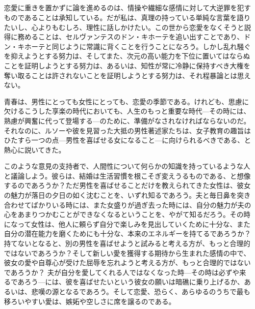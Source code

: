 \subsection{}

  恋愛に重きを置かずに論を進めるのは、情操や繊細な感情に対して大逆罪を犯すものであることは承知している。だが私は、真理の持っている単純な言葉を語りたいし、心よりもむしろ、理性に話しかけたい。この世から恋愛をなくそうと説得に務めることは、セルヴァンテスのドン・キホーテを追い出すことであり、ドン・キホーテと同じように常識に背くことを行うことになろう。しかし乱れ騒ぐを抑えようとする努力は、そしてまた、次元の高い能力を下位に置いてはならぬことを証明しようとする努力は、あるいは、知性が常に冷静に保持すべき大権を奪い取ることは許されないことを証明しようとする努力は、それ程暴論とは思えない。

  青春は、男性にとっても女性にとっても、恋愛の季節である。けれども、思慮に欠けるこうした享楽の時代においても、人生のもっと重要な時代{\——}その時には、熟慮が興奮に代って登場する{\——}のために、準備がなされなければならないのだ。それなのに、ルソーや彼を見習った大抵の男性著述家たちは、女子教育の趣旨はひたすら一つの点{\——}男性を喜ばせる女になること{\——}に向けられるべきである、と熱心に説いてきた。

  このような意見の支持者で、人間性について何らかの知識を持っているような人と議論しよう。彼らは、結婚は生活習慣を根こそぎ変えうるものである、と想像するのであろうか？ただ男性を喜ばせることだけを教えられてきた女性は、彼女の魅力が落日の夕日の如く沈むことを、いずれ知るであろう。夫と毎日鼻を突き合わせてばかりいる時には、また女盛りが過ぎ去った時には、自分の魅力が夫の心をあまりつかむことができなくなるということを、やがて知るだろう。その時になって女性は、他人に頼らず自分で楽しみを見出していくために十分な、また自分の潜在能力を磨くためにも十分な、本来のエネルギーを持てるであろうか？持てないとなると、別の男性を喜ばせようと試みると考える方が、もっと合理的ではないであろうか？そして新しい愛を獲得する期待から生まれた感情の中で、彼女の愛や自尊心が受けた屈辱を忘れようと考える方が、もっと合理的ではないであろうか？ 夫が自分を愛してくれる人ではなくなった時{\——}その時は必ずや来るであろう{\——}には、彼を喜ばせたいという彼女の願いは暗礁に乗り上げるか、あるいは、悲嘆の源となるであろう。そして恋愛、恐らく、あらゆるのうちで最も移ろいやすい愛は、嫉妬や空しさに席を譲るのである。

